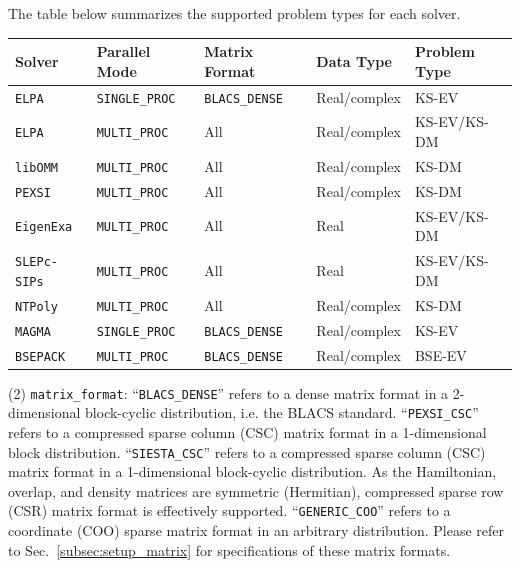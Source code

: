 \documentclass{report}
\begin{document}
The table below summarizes the supported problem types for each solver.

\begin{tabular}[]{|p{32mm}|p{32mm}|p{32mm}|p{32mm}|p{32mm}|}
\hline
\multicolumn{1}{|l|}{\textbf{Solver}} & \multicolumn{1}{l|}{\textbf{Parallel Mode}} & \multicolumn{1}{l|}{\textbf{Matrix Format}} & \multicolumn{1}{l|}{\textbf{Data Type}} & \multicolumn{1}{l|}{\textbf{Problem Type}}\\
\hline
\texttt{ELPA}       & \texttt{SINGLE\_PROC} & \texttt{BLACS\_DENSE} & Real/complex & KS-EV\\
\hline
\texttt{ELPA}       & \texttt{MULTI\_PROC}  & All                   & Real/complex & KS-EV/KS-DM\\
\hline
\texttt{libOMM}     & \texttt{MULTI\_PROC}  & All                   & Real/complex & KS-DM\\
\hline
\texttt{PEXSI}      & \texttt{MULTI\_PROC}  & All                   & Real/complex & KS-DM\\
\hline
\texttt{EigenExa}   & \texttt{MULTI\_PROC}  & All                   & Real         & KS-EV/KS-DM\\
\hline
\texttt{SLEPc-SIPs} & \texttt{MULTI\_PROC}  & All                   & Real         & KS-EV/KS-DM\\
\hline
\texttt{NTPoly}     & \texttt{MULTI\_PROC}  & All                   & Real/complex & KS-DM\\
\hline
\texttt{MAGMA}      & \texttt{SINGLE\_PROC} & \texttt{BLACS\_DENSE} & Real/complex & KS-EV\\
\hline
\texttt{BSEPACK}    & \texttt{MULTI\_PROC}  & \texttt{BLACS\_DENSE} & Real/complex & BSE-EV\\
\hline
\end{tabular}

(2) \texttt{matrix\_format}: ``\texttt{BLACS\_DENSE}'' refers to a dense matrix format in a 2-dimensional block-cyclic distribution, i.e. the BLACS standard. ``\texttt{PEXSI\_CSC}'' refers to a compressed sparse column (CSC) matrix format in a 1-dimensional block distribution. ``\texttt{SIESTA\_CSC}'' refers to a compressed sparse column (CSC) matrix format in a 1-dimensional block-cyclic distribution. As the Hamiltonian, overlap, and density matrices are symmetric (Hermitian), compressed sparse row (CSR) matrix format is effectively supported. ``\texttt{GENERIC\_COO}'' refers to a coordinate (COO) sparse matrix format in an arbitrary distribution. Please refer to Sec.~\ref{subsec:setup_matrix} for specifications of these matrix formats.
\end{document}

